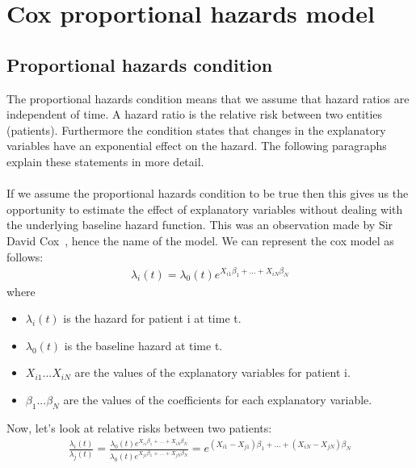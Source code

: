 \section{Cox proportional hazards model}
\label{sec:cox-proportional-hazards-model}
\subsection{Proportional hazards condition}
The proportional hazards condition means that we assume that hazard ratios are independent of time. A hazard ratio is the relative risk between two entities (patients). Furthermore the condition states that changes in the explanatory variables have an exponential effect on the hazard. The following paragraphs explain these statements in more detail.\\ \\
If we assume the proportional hazards condition to be true then this gives us the opportunity to estimate the effect of explanatory variables without dealing with the underlying baseline hazard function. This was an observation made by Sir David Cox~\cite{cox1972life}, hence the name of the model. We can represent the cox model as follows:
\begin{equation}
\begin{split}
\lambda_{i}(t) = \lambda_{0}(t)e^{X_{i1}\beta_{1} + ... + X_{iN}\beta_{N}}
\end{split}
\end{equation}
where
\begin{itemize}
	\item $\lambda_{i}(t)$ is the hazard for patient i at time t.
	\item $\lambda_{0}(t)$ is the baseline hazard at time t.
	\item $X_{i1} ... X_{iN}$ are the values of the explanatory variables for patient i.
	\item $\beta_{1} ... \beta_{N}$ are the values of the coefficients for each explanatory variable.
\end{itemize}
Now, let's look at relative risks between two patients:
\begin{equation}
\begin{split}
\frac{\lambda_{i}(t)}{\lambda_{j}(t)} 
= \frac{\lambda_{0}(t)e^{X_{i1}\beta_{1} + ... + X_{iN}\beta_{N}}}{\lambda_{0}(t)e^{X_{j1}\beta_{1} + ... + X_{jN}\beta_{N}}}
= e^{(X_{i1}-X_{j1})\beta_{1} + ... + (X_{iN}-X_{jN})\beta_{N}}
\end{split}
\end{equation}
